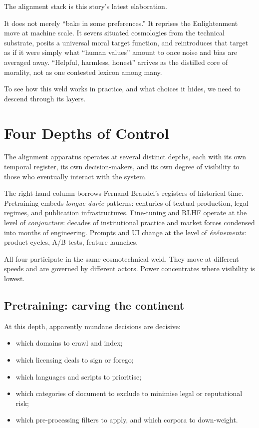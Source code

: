 The alignment stack is this story's latest elaboration.

It does not merely ``bake in some preferences.'' It reprises the Enlightenment move at machine scale. It severs situated cosmologies from the technical substrate, posits a universal moral target function, and reintroduces that target as if it were simply what ``human values'' amount to once noise and bias are averaged away. ``Helpful, harmless, honest'' arrives as the distilled core of morality, not as one contested lexicon among many.

To see how this weld works in practice, and what choices it hides, we need to descend through its layers.

\section{Four Depths of Control}

The alignment apparatus operates at several distinct depths, each with its own temporal register, its own decision-makers, and its own degree of visibility to those who eventually interact with the system.

\begin{formalbox}[title={Four Depths of Control}]

\end{formalbox}

The right-hand column borrows Fernand Braudel's registers of historical time. Pretraining embeds \emph{longue dur\'ee} patterns: centuries of textual production, legal regimes, and publication infrastructures. Fine-tuning and RLHF operate at the level of \emph{conjoncture}: decades of institutional practice and market forces condensed into months of engineering. Prompts and UI change at the level of \emph{\'ev\'enements}: product cycles, A/B tests, feature launches.

All four participate in the same cosmotechnical weld. They move at different speeds and are governed by different actors. Power concentrates where visibility is lowest.

\subsection{Pretraining: carving the continent}

At this depth, apparently mundane decisions are decisive:

\begin{itemize}
  \item which domains to crawl and index;
  \item which licensing deals to sign or forego;
  \item which languages and scripts to prioritise;
  \item which categories of document to exclude to minimise legal or reputational risk;
  \item which pre-processing filters to apply, and which corpora to down-weight.
\end{itemize}

